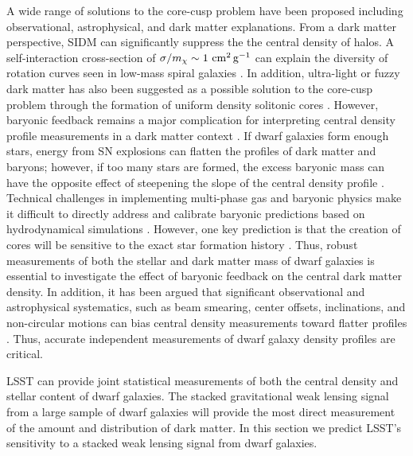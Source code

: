 A wide range of solutions to the core-cusp problem have been proposed including observational, astrophysical, and dark matter explanations.
From a dark matter perspective, SIDM can significantly suppress the the central density of halos.
A self-interaction cross-section of $\sigma / m_\chi \sim 1 \mathrm{\,\mathrm{\,cm}^2\mathrm{\,g}^{-1}}$ can explain the diversity of rotation curves seen in low-mass spiral galaxies \citep[\eg][]{1504.01437,2017PhRvL.119k1102K,Tulin:2017ara}.
In addition, ultra-light or fuzzy dark matter has also been suggested as a possible solution to the core-cusp problem through the formation of uniform density solitonic cores \citep[\eg][]{1502.03456,Hui:2017}. 
However, baryonic feedback remains a major complication for interpreting central density profile measurements in a dark matter context \citep{1996MNRAS.283L..72N,2005MNRAS.356..107R,2008Sci...319..174M,2012MNRAS.421.3464P,Madau:2014,Read:2016}. 
If dwarf galaxies form enough stars, energy from SN explosions can flatten the profiles of dark matter and baryons; however, if too many stars are formed, the excess baryonic mass can have the opposite effect of steepening the slope of the central density profile \citep{Bullock:2017}.
Technical challenges in implementing multi-phase gas and baryonic physics make it difficult to directly address and calibrate baryonic predictions based on hydrodynamical simulations \citep{Tollet:2016,1611.02281,Sawala:2016}.
However, one key prediction is that the creation of cores will be sensitive to the exact star formation history \citep[\eg][]{governato2012,dicintio2014,onorbe2015,Read:2016,read2018,1811.11768,2019MNRAS.tmp....3R}.
Thus, robust measurements of both the stellar and dark matter mass of dwarf galaxies is essential to investigate the effect of baryonic feedback on the central dark matter density.
In addition, it has been argued that significant observational and astrophysical systematics, such as beam smearing, center offsets, inclinations, and non-circular motions can bias central density measurements toward flatter profiles \citep[\eg][]{astro-ph/0006048,2004ApJ...617.1059R,2008AJ....136.2761O,2016MNRAS.462.3628R}. 
Thus, accurate independent measurements of dwarf galaxy density profiles are critical.

LSST can provide joint statistical measurements of both the central density and stellar content of dwarf galaxies. 
The stacked gravitational weak lensing signal from a large sample of dwarf galaxies will provide the most direct measurement of the amount and distribution of dark matter.  
In this section we predict LSST's sensitivity to a stacked weak lensing signal from dwarf galaxies.

